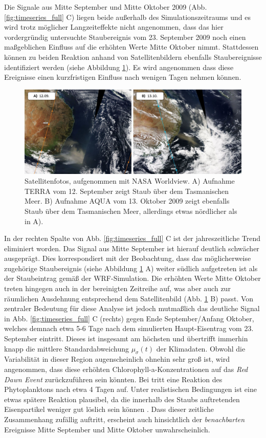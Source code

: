\documentclass[12pt,a4paper,onecolumn,headheight=30pt]{scrartcl}
\begin{document}
Die Signale aus Mitte September und Mitte Oktober 2009 (Abb. \ref{fig:timeseries_full} C) liegen beide außerhalb des Simulationszeitraums und es wird trotz möglicher Langzeiteffekte \citep{Boyd.2010} nicht angenommen, dass das hier vordergründig untersuchte Staubereignis vom 23. September 2009 noch einen maßgeblichen Einfluss auf die erhöhten Werte Mitte Oktober nimmt. Stattdessen können zu beiden Reaktion anhand von Satellitenbildern ebenfalls Staubereignisse identifiziert werden (siehe Abbildung \ref{fig:duststorms_surrounding}). Es wird angenommen dass diese Ereignisse einen kurzfristigen Einfluss nach wenigen Tagen nehmen können. 
\begin{figure}[htbp]
\includegraphics[width=\textwidth]{bilder/duststorms_surround.png}
\caption{Satellitenfotos, aufgenommen mit NASA Worldview. A) Aufnahme TERRA vom 12. September zeigt Staub über dem Tasmanischen Meer. B) Aufnahme AQUA vom 13. Oktober 2009 zeigt ebenfalls Staub über dem Tasmanischen Meer, allerdings etwas nördlicher als in A). } \label{fig:duststorms_surrounding}
\end{figure}
In der rechten Spalte von Abb. \ref{fig:timeseries_full} C ist der jahreszeitliche Trend eliminiert worden. Das Signal aus Mitte September ist hierauf deutlich schwächer ausgeprägt. Dies korrespondiert mit der Beobachtung, dass das möglicherweise zugehörige Staubereignis (siehe Abbildung \ref{fig:duststorms_surrounding} A) weiter südlich aufgetreten ist als der Staubeintrag gemäß der WRF-Simulation. Die erhöhten Werte Mitte Oktober treten hingegen auch in der bereinigten Zeitreihe auf, was aber auch zur räumlichen Ausdehnung entsprechend dem Satellitenbild (Abb. \ref{fig:duststorms_surrounding} B) passt. Von zentraler Bedeutung für diese Analyse ist jedoch mutmaßlich das deutliche Signal in Abb. \ref{fig:timeseries_full} C (rechts) gegen Ende September/Anfang Oktober, welches demnach etwa 5-6 Tage nach dem simulierten Haupt-Eisentrag vom 23. September eintritt. Dieses ist insgesamt am höchsten und übertrifft immerhin knapp die mittlere Standardabweichung $\mu_\sigma(t)$ der Klimadaten. Obwohl die Variabilität in dieser Region augenscheinlich ohnehin sehr groß ist, wird angenommen, dass diese erhöhten Chlorophyll-a-Konzentrationen auf das \textit{Red Dawn Event} zurückzuführen sein könnten. Bei \citet{Martin.1988} tritt eine Reaktion des Phytoplanktons nach etwa 4 Tagen auf. Unter realistischen Bedingungen ist eine etwas spätere Reaktion plausibel, da die innerhalb des Staubs auftretenden Eisenpartikel weniger gut löslich sein können \citep{Shao.2011}. Dass dieser zeitliche Zusammenhang zufällig auftritt, erscheint auch hinsichtlich der \textit{benachbarten} Ereignisse Mitte September und Mitte Oktober unwahrscheinlich. \\
\end{document}
